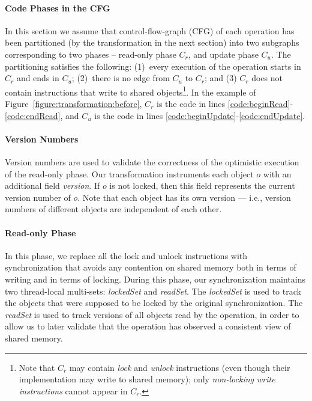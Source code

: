 \paragraph{Code Phases in the CFG}
In this section we assume that
control-flow-graph (CFG) of each operation has been partitioned (by the transformation in the next section)
into two subgraphs corresponding to two phases --
read-only phase $C_r$, and update phase $C_u$. The partitioning satisfies the following:
(1)~every execution of the operation starts in $C_r$ and ends in $C_u$; (2)~there is no edge from $C_u$ to  $C_r$;
and (3) $C_r$ does not contain instructions that write to shared objects\footnote{
Note that $C_r$ may contain \emph{lock} and \emph{unlock} instructions (even though their implementation may write to shared memory);
only \emph{non-locking write instructions} cannot appear in $C_r$.}.
%
In the example of Figure~\ref{figure:transformation:before}, $C_r$ is the code in lines \ref{code:beginRead}-\ref{code:endRead},
and $C_u$ is the code in lines \ref{code:beginUpdate}-\ref{code:endUpdate}.

\paragraph{Version Numbers}
Version numbers are used to validate the correctness of the optimistic execution of the read-only phase.
Our transformation instruments each object $o$ with an additional field \emph{version}.
If $o$ is not locked, then this field  represents the current version number of $o$.
Note that each object has its own version --- i.e., version numbers of different objects are independent of each other.

\paragraph{Read-only Phase}
In this phase, we replace all the lock and unlock instructions with synchronization that avoids any contention on shared memory both in terms of writing and in terms of locking.
During this phase, our synchronization maintains two thread-local multi-sets: \emph{lockedSet} and \emph{readSet}.
The \emph{lockedSet} is used to track the objects that were supposed to be locked by the original synchronization.
%
The \emph{readSet} is used to track versions of all objects read by the
operation, in order to allow us to later validate that the operation has observed a consistent view of shared memory.

